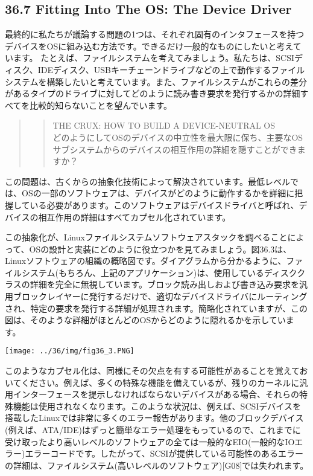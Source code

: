 \hypertarget{fitting-into-the-os-the-device-driver}{%
\subsection*{36.7 Fitting Into The OS: The Device
Driver}\label{fitting-into-the-os-the-device-driver}}

最終的に私たちが議論する問題の1つは、それぞれ固有のインタフェースを持つデバイスをOSに組み込む方法です。できるだけ一般的なものにしたいと考えています。
たとえば、ファイルシステムを考えてみましょう。私たちは、SCSIディスク、IDEディスク、USBキーチェーンドライブなどの上で動作するファイルシステムを構築したいと考えています。また、ファイルシステムがこれらの差分があるタイプのドライブに対してどのように読み書き要求を発行するかの詳細すべてを比較的知らないことを望んでいます。

\begin{quote}
\begin{quote}
THE CRUX: HOW TO BUILD A DEVICE-NEUTRAL OS\\
どのようにしてOSのデバイスの中立性を最大限に保ち、主要なOSサブシステムからのデバイスの相互作用の詳細を隠すことができますか？
\end{quote}
\end{quote}

この問題は、古くからの抽象化技術によって解決されています。最低レベルでは、OSの一部のソフトウェアは、デバイスがどのように動作するかを詳細に把握している必要があります。このソフトウェアはデバイスドライバと呼ばれ、デバイスの相互作用の詳細はすべてカプセル化されています。

この抽象化が、Linuxファイルシステムソフトウェアスタックを調べることによって、OSの設計と実装にどのように役立つかを見てみましょう。図36.3は、Linuxソフトウェアの組織の概略図です。ダイアグラムから分かるように、ファイルシステム(もちろん、上記のアプリケーション)は、使用しているディスククラスの詳細を完全に無視しています。ブロック読み出しおよび書き込み要求を汎用ブロックレイヤーに発行するだけで、適切なデバイスドライバにルーティングされ、特定の要求を発行する詳細が処理されます。簡略化されていますが、この図は、そのような詳細がほとんどのOSからどのように隠れるかを示しています。

\texttt{[image: ../36/img/fig36\_3.PNG]}

このようなカプセル化は、同様にその欠点を有する可能性があることを覚えておいてください。例えば、多くの特殊な機能を備えているが、残りのカーネルに汎用インターフェースを提示しなければならないデバイスがある場合、それらの特殊機能は使用されなくなります。このような状況は、例えば、SCSIデバイスを搭載したLinuxでは非常に多くのエラー報告があります。他のブロックデバイス(例えば、ATA/IDE)はずっと簡単なエラー処理をもっているので、これまでに受け取ったより高いレベルのソフトウェアの全ては一般的なEIO(一般的なIOエラー)エラーコードです。したがって、SCSIが提供している可能性のあるエラーの詳細は、ファイルシステム(高いレベルのソフトウェア){[}G08{]}では失われます。

